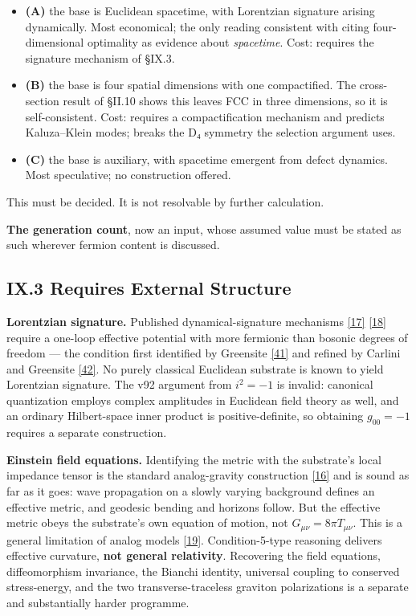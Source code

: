 \documentclass[a4paper,11pt]{article}
\begin{document}
\begin{itemize}
\item \textbf{(A)} the base is Euclidean spacetime, with Lorentzian signature arising dynamically. Most economical; the only reading consistent with citing four-dimensional optimality as evidence about \textit{spacetime}. Cost: requires the signature mechanism of §IX.3.
\item \textbf{(B)} the base is four spatial dimensions with one compactified. The cross-section result of §II.10 shows this leaves FCC in three dimensions, so it is self-consistent. Cost: requires a compactification mechanism and predicts Kaluza–Klein modes; breaks the D₄ symmetry the selection argument uses.
\item \textbf{(C)} the base is auxiliary, with spacetime emergent from defect dynamics. Most speculative; no construction offered.
\end{itemize}

This must be decided. It is not resolvable by further calculation.

\textbf{The generation count}, now an input, whose assumed value must be stated as such wherever fermion content is discussed.

\subsection*{IX.3 Requires External Structure}

\textbf{Lorentzian signature.} Published dynamical-signature mechanisms \hyperref[ref17]{[17]} \hyperref[ref18]{[18]} require a one-loop effective potential with more fermionic than bosonic degrees of freedom — the condition first identified by Greensite \hyperref[ref41]{[41]} and refined by Carlini and Greensite \hyperref[ref42]{[42]}. No purely classical Euclidean substrate is known to yield Lorentzian signature. The v92 argument from $i^2=-1$ is invalid: canonical quantization employs complex amplitudes in Euclidean field theory as well, and an ordinary Hilbert-space inner product is positive-definite, so obtaining $g_{00}=-1$ requires a separate construction.

\textbf{Einstein field equations.} Identifying the metric with the substrate's local impedance tensor is the standard analog-gravity construction \hyperref[ref16]{[16]} and is sound as far as it goes: wave propagation on a slowly varying background defines an effective metric, and geodesic bending and horizons follow. But the effective metric obeys the substrate's own equation of motion, not $G_{\mu\nu}=8\pi T_{\mu\nu}$. This is a general limitation of analog models \hyperref[ref19]{[19]}. Condition-5-type reasoning delivers effective curvature, \textbf{not general relativity}. Recovering the field equations, diffeomorphism invariance, the Bianchi identity, universal coupling to conserved stress-energy, and the two transverse-traceless graviton polarizations is a separate and substantially harder programme.
\end{document}
